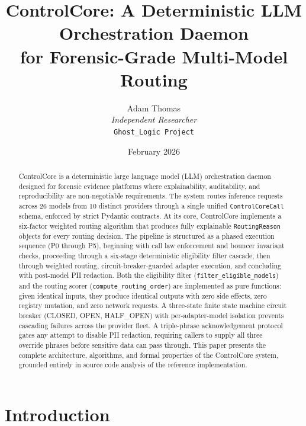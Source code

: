 \documentclass[11pt,a4paper]{article}
\title{%
  \textbf{ControlCore: A Deterministic LLM Orchestration Daemon\\
  for Forensic-Grade Multi-Model Routing}
}
\author{%
  Adam Thomas\\
  \textit{Independent Researcher}\\
  \texttt{Ghost\_Logic Project}
}
\date{February 2026}
\theoremstyle{plain}
\theoremstyle{definition}
\begin{document}
\maketitle
\thispagestyle{fancy}

\begin{abstract}
ControlCore is a deterministic large language model (LLM) orchestration daemon
designed for forensic evidence platforms where explainability, auditability, and
reproducibility are non-negotiable requirements. The system routes inference
requests across 26 models from 10 distinct providers through a single unified
\texttt{ControlCoreCall} schema, enforced by strict Pydantic contracts. At its
core, ControlCore implements a six-factor weighted routing algorithm that
produces fully explainable \texttt{RoutingReason} objects for every routing
decision. The pipeline is structured as a phased execution sequence (P0 through
P5), beginning with call law enforcement and bouncer invariant checks, proceeding
through a six-stage deterministic eligibility filter cascade, then through
weighted routing, circuit-breaker-guarded adapter execution, and concluding with
post-model PII redaction. Both the eligibility filter
(\texttt{filter\_eligible\_models}) and the routing scorer
(\texttt{compute\_routing\_order}) are implemented as pure functions: given
identical inputs, they produce identical outputs with zero side effects, zero
registry mutation, and zero network requests. A three-state finite state machine
circuit breaker (CLOSED, OPEN, HALF\_OPEN) with per-adapter-model isolation
prevents cascading failures across the provider fleet. A triple-phrase
acknowledgement protocol gates any attempt to disable PII redaction, requiring
callers to supply all three override phrases before sensitive data can pass
through. This paper presents the complete architecture, algorithms, and formal
properties of the ControlCore system, grounded entirely in source code analysis
of the reference implementation.
\end{abstract}

\tableofcontents
\newpage

\section{Introduction}
\label{sec:introduction}
\end{document}

